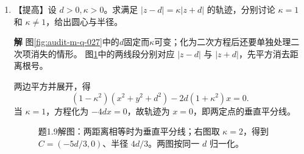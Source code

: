 \documentclass[11pt,openany,fontset=fandol]{ctexbook}
\theoremstyle{plain}\newtheorem{theorem}{定理}[chapter]\newtheorem{proposition}[theorem]{命题}
\theoremstyle{definition}\newtheorem{definition}{定义}[chapter]\newtheorem{example}{例}[chapter]
\theoremstyle{remark}\newtheorem*{remark}{说明}
\newcommand{\SolutionStart}{\par\nobreak\medskip\nobreak\noindent\textbf{解}\quad\ignorespaces}
\newenvironment{solution}{\SolutionStart}{\par\medskip}
\begin{document}
\begin{enumerate}[label=1.\arabic*]
\begin{solution}
第二积分取上半圆闭路，内部只有 $\ii a$ 这一二阶极点。写 $f=(z-\ii a)^{-2}g(z)$、$g=(z+\ii a)^{-2}$，得
\[
g'(z)=-2(z+\ii a)^{-3},\qquad
\Res(f,\ii a)=g'(\ii a)=-\frac2{(2\ii a)^3}=\frac1{4\ii a^3}.
\]
半径 $R>a$ 的圆弧上，积分模不超过 $\pi R/(R^2-a^2)^2$，随 $R\to\infty$ 趋零。于是实积分等于 $2\pi\ii/(4\ii a^3)=\pi/(2a^3)$。正被积函数的结果为正，量纲为 $a^{-3}$，均符合检查。

第一问沿圆闭合，需计入两个简单极点；第二问沿图\ref{fig:orig-014}的上半圆闭合，只计入 $\ii a$ 处的二阶极点。
\end{solution}

\item \begin{minipage}[t]{\linewidth}
【提高】设 $d>0,\kappa>0$。求满足 $|z-d|=\kappa|z+d|$ 的轨迹，分别讨论 $\kappa=1$ 和 $\kappa\ne1$，给出圆心与半径。

\end{minipage}

\begin{solution}
图\ref{fig:audit-m-q-027}中的$d$固定而$\kappa$可变；化为二次方程后还要单独处理二次项消失的情形。
图\ref{fig:ex-1-9}中的两线段分别对应 $|z-d|$ 与 $|z+d|$，先平方消去距离根号。

两边平方并展开，得
\[
(1-\kappa^2)(x^2+y^2+d^2)-2d(1+\kappa^2)x=0.
\]
当 $\kappa=1$，方程化为 $-4dx=0$，故轨迹为 $x=0$，即两定点的垂直平分线。

\begin{figure}[H]\centering
{}
\caption{题1.9解图：两距离相等时为垂直平分线；右图取 $\kappa=2$，得到 $C=(-5d/3,0)$、半径 $4d/3$。两图按同一 $d$ 归一化。}\label{fig:ex-1-9}
\end{figure}


\end{solution}
\end{enumerate}
\end{document}
